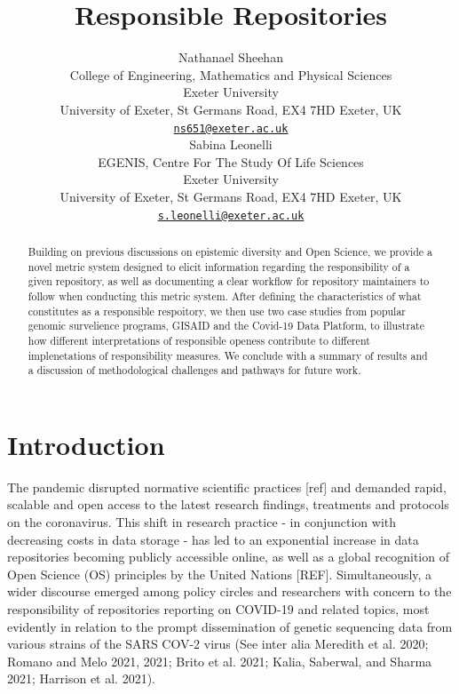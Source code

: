 \documentclass{article}
\title{Responsible Repositories}
\author{
    Nathanael Sheehan
   \\
    College of Engineering, Mathematics and Physical Sciences \\
    Exeter University \\
  University of Exeter, St Germans Road, EX4 7HD Exeter, UK \\
  \texttt{\href{mailto:ns651@exeter.ac.uk}{\nolinkurl{ns651@exeter.ac.uk}}} \\
   \And
    Sabina Leonelli
   \\
    EGENIS, Centre For The Study Of Life Sciences \\
    Exeter University \\
  University of Exeter, St Germans Road, EX4 7HD Exeter, UK \\
  \texttt{\href{mailto:s.leonelli@exeter.ac.uk}{\nolinkurl{s.leonelli@exeter.ac.uk}}} \\
  }
\begin{document}
\maketitle


\begin{abstract}
Building on previous discussions on epistemic diversity and Open
Science, we provide a novel metric system designed to elicit information
regarding the responsibility of a given repository, as well as
documenting a clear workflow for repository maintainers to follow when
conducting this metric system. After defining the characteristics of
what constitutes as a responsible respoitory, we then use two case
studies from popular genomic survelience programs, GISAID and the
Covid-19 Data Platform, to illustrate how different interpretations of
responsible openess contribute to different implenetations of
responsibility measures. We conclude with a summary of results and a
discussion of methodological challenges and pathways for future work.
\end{abstract}


\newpage

\hypertarget{introduction}{%
\section{Introduction}\label{introduction}}

The pandemic disrupted normative scientific practices {[}ref{]} and
demanded rapid, scalable and open access to the latest research
findings, treatments and protocols on the coronavirus. This shift in
research practice - in conjunction with decreasing costs in data storage
- has led to an exponential increase in data repositories becoming
publicly accessible online, as well as a global recognition of Open
Science (OS) principles by the United Nations {[}REF{]}. Simultaneously,
a wider discourse emerged among policy circles and researchers with
concern to the responsibility of repositories reporting on COVID-19 and
related topics, most evidently in relation to the prompt dissemination
of genetic sequencing data from various strains of the SARS COV-2 virus
(See inter alia Meredith et al. 2020; Romano and Melo 2021, 2021; Brito
et al. 2021; Kalia, Saberwal, and Sharma 2021; Harrison et al. 2021).
\end{document}
